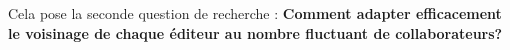 Cela pose la seconde question de recherche : \textbf{Comment adapter
  efficacement le voisinage de chaque éditeur au nombre fluctuant de
  collaborateurs?}




